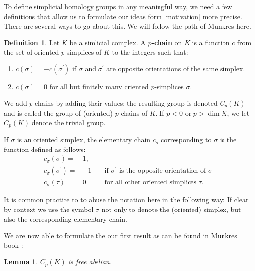\documentclass[toc=bib, headinclude]{scrartcl}
\theoremstyle{plain}
\newtheorem{lemma}[theorem]{Lemma}
\theoremstyle{definition}
\newtheorem	{definition}[theorem]{Definition}
\theoremstyle{remark}
\begin{document}
To define simplicial homology groups in any meaningful way, we need a few definitions that allow us to formulate our ideas form \autoref{motivation} more precise. There are several ways to go about this. We will follow the path of Munkres \cite[p. 27]{mu} here.

\begin{definition}\label{def-chain}
	Let $K$ be a simlicial complex. A \textbf{$p$-chain} on $K$ is a function $c$ from the set of oriented $p$-simplices of $K$ to the integers such that:
	\begin{enumerate}
		\item $c(\sigma)=-c(\sigma^\prime)$ if $\sigma$ and $\sigma^\prime$ are opposite orientations of the same simplex.
		\item $c(\sigma)=0$ for all but finitely many oriented $p$-simplices $\sigma$.
	\end{enumerate}
We add $p$-chains by adding their values; the resulting group is denoted $C_p(K)$ and is called the group of (oriented) $p$-chains of $K$. If $p<0$ or $p>\dim K$, we let $C_p(K)$ denote the trivial group.

If $\sigma$ is an oriented simplex, the elementary chain $c_\sigma$ corresponding to $\sigma$ is the function defined as follows:
\begin{align*}c_\sigma(\sigma)=&1,\\
 c_\sigma(\sigma^\prime)=&-1&&\text{ if $\sigma^\prime$ is the opposite orientation of $\sigma$}\\
 c_\sigma(\tau)=&0 &&\text{ for all other oriented simplices $\tau$.} 
 \end{align*}
\end{definition}

It is common practice to to abuse the notation here in the following way: If clear by context we use the symbol $\sigma$ not only to denote the (oriented) simplex, but also the corresponding elementary chain.

We are now able to formulate the our first result as can be found in Munkres book \cite[Lemma 5.1, p. 28]{mu}:
\begin{lemma}
	$C_p(K)$ is free abelian. 
\end{lemma}
\end{document}
